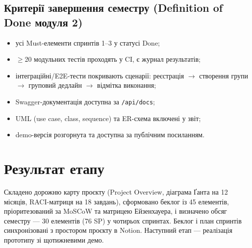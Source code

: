 \documentclass[12pt]{article}
\begin{document}
\subsection{Критерії завершення семестру (Definition of Done модуля 2)}
\begin{itemize}[leftmargin=1.5em,nosep]
  \item усі Must-елементи спринтів 1--3 у статусі Done;
  \item $\geq$20 модульних тестів проходять у CI, є журнал результатів;
  \item інтеграційні/E2E-тести покривають сценарії: реєстрація $\to$ створення групи $\to$ груповий дедлайн $\to$ відмітка виконання;
  \item Swagger-документація доступна за \texttt{/api/docs};
  \item UML (use case, class, sequence) та ER-схема включені у звіт;
  \item demo-версія розгорнута та доступна за публічним посиланням.
\end{itemize}

\section{Результат етапу}
Складено дорожню карту проєкту (Project Overview, діаграма Ґанта на 12 місяців, RACI-матриця на 18 завдань), сформовано беклог із 45 елементів, пріоритезований за MoSCoW та матрицею Ейзенхауера, і визначено обсяг семестру --- 30 елементів (76 SP) у чотирьох спринтах. Беклог і план спринтів синхронізовані з простором проєкту в Notion. Наступний етап --- реалізація прототипу зі щотижневими демо.
\end{document}
